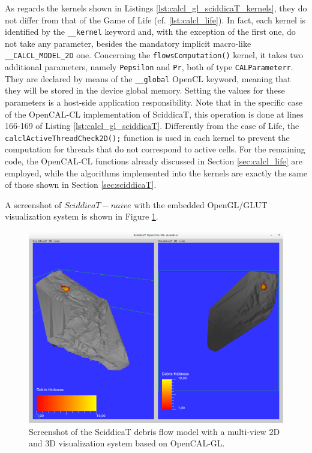 As regards the kernels shown in Listings
\ref{lst:calcl_gl_sciddicaT_kernels}, they do not differ from that of
the Game of Life (cf. \ref{lst:calcl_life}). In fact, each kernel is
identified by the \verb'__kernel' keyword and, with the exception of
the first one, do not take any parameter, besides the mandatory
implicit macro-like \verb'__CALCL_MODEL_2D' one. Concerning the
\verb'flowsComputation()' kernel, it takes two additional parameters,
namely \verb'Pepsilon' and \verb'Pr', both of type
\verb'CALParameterr'. They are declared by means of the
\verb'__global' OpenCL keyword, meaning that they will be stored in
the device global memory. Setting the values for these parameters is
a host-side application responsibility. Note that in the specific case of the
OpenCAL-CL implementation of SciddicaT, this operation is done at lines
166-169 of Listing \ref{lst:calcl_gl_sciddicaT}. Differently from the case of Life, the
\verb'calclActiveThreadCheck2D();' function is used in each kernel to
prevent the computation for threads that do not correspond to active
cells. For the remaining code, the OpenCAL-CL functions already
discussed in Section \ref{sec:calcl_life} are employed, while the
algorithms implemented into the kernels are exactly the same of those
shown in Section \ref{sec:sciddicaT}.

A screenshot of $SciddicaT-{naive}$ with the embedded OpenGL/GLUT
visualization system is shown in Figure \ref{fig:calgl_sciddicaT2}.

\begin{figure}
  \begin{center}
    \includegraphics[width=11.4cm]{./images/OpenCAL/calgl_sciddicaT1}
    \caption{Screenshot of the SciddicaT debris flow model with a
      multi-view 2D and 3D visualization system based on OpenCAL-GL.}
    \label{fig:calgl_sciddicaT2}
  \end{center}
\end{figure}


